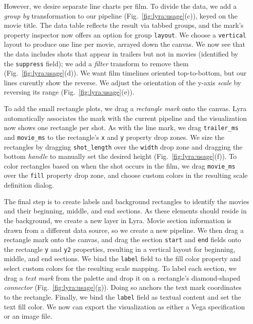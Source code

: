However, we desire separate line charts per film. To divide the data, we add a
\emph{group by} transformation to our pipeline (Fig.~\ref{fig:lyra:usage}(c)),
keyed on the movie title. The data table reflects the result via tabbed groups,
and the mark's property inspector now offers an option for group
\texttt{layout}. We choose a \texttt{vertical} layout to produce one line per
movie, arrayed down the canvas. We now see that the data includes shots that
appear in trailers but not in movies (identified by the \texttt{suppress}
field); we add a \emph{filter} transform to remove them
(Fig.~\ref{fig:lyra:usage}(d)). We want film timelines oriented top-to-bottom,
but our lines curently show the reverse. We adjust the orientation of the y-axis
\emph{scale} by reversing its range (Fig.~\ref{fig:lyra:usage}(e)).

To add the small rectangle plots, we drag a \emph{rectangle mark} onto the
canvas. Lyra automatically associates the mark with the current pipeline and the
visualization now shows one rectangle per shot. As with the line mark, we drag
\texttt{trailer\_ms} and \texttt{movie\_ms} to the rectangle's \texttt{x} and
\texttt{y} property drop zones. We size the rectangles by dragging
\texttt{shot\_length} over the \texttt{width} drop zone and dragging the bottom
\emph{handle} to manually set the desired height (Fig.~\ref{fig:lyra:usage}(f)).
To color rectangles based on when the shot occurs in the film, we drag
\texttt{movie\_ms} over the \texttt{fill} property drop zone, and choose custom
colors in the resulting scale definition dialog.

The final step is to create labels and background rectangles to identify the
movies and their beginning, middle, and end sections. As these elements should
reside in the background, we create a new layer in Lyra. Movie section
information is drawn from a different data source, so we create a new pipeline.
We then drag a rectangle mark onto the canvas, and drag the section
\texttt{start} and \texttt{end} fields onto the rectangle \texttt{y} and
\texttt{y2} properties, resulting in a vertical layout for beginning, middle,
and end sections. We bind the \texttt{label} field to the fill color property
and select custom colors for the resulting scale mapping. To label each section,
we drag a \emph{text mark} from the palette and drop it on a rectangle's
diamond-shaped \emph{connector} (Fig.~\ref{fig:lyra:usage}(g)). Doing so anchors
the text mark coordinates to the rectangle. Finally, we bind the \texttt{label}
field as textual content and set the text fill color. We now can export the
visualization as either a Vega specification or an image file.
